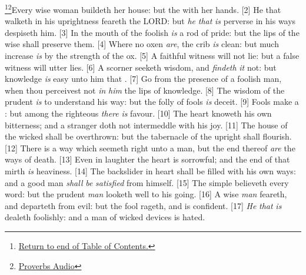 \footnote{\textcolor[cmyk]{0.99998,1,0,0}{\hyperlink{TOC}{Return to end of Table of Contents.}}}\footnote{\href{https://www.audioverse.org/english/audiobibles/books/ENGKJV/O/Prov/1}{\textcolor[cmyk]{0.99998,1,0,0}{Proverbs Audio}}}\textcolor[cmyk]{0.99998,1,0,0}{Every wise woman buildeth her house: but the  with her hands.}
[2] \textcolor[cmyk]{0.99998,1,0,0}{He that walketh in his uprightness feareth the LORD: but \emph{he} \emph{that} \emph{is} perverse in his ways despiseth him.}
[3] \textcolor[cmyk]{0.99998,1,0,0}{In the mouth of the foolish \emph{is} a rod of pride: but the lips of the wise shall preserve them.}
[4] \textcolor[cmyk]{0.99998,1,0,0}{Where no oxen \emph{are}, the crib \emph{is} clean: but much increase \emph{is} by the strength of the ox.}
[5] \textcolor[cmyk]{0.99998,1,0,0}{A faithful witness will not lie: but a false witness will utter lies.}
[6] \textcolor[cmyk]{0.99998,1,0,0}{A scorner seeketh wisdom, and \emph{findeth} \emph{it} not: but knowledge \emph{is} easy unto him that .}
[7] \textcolor[cmyk]{0.99998,1,0,0}{Go from the presence of a foolish man, when thou perceivest not \emph{in} \emph{him} the lips of knowledge.}
[8] \textcolor[cmyk]{0.99998,1,0,0}{The wisdom of the prudent \emph{is} to understand his way: but the folly of fools \emph{is} deceit.}
[9] \textcolor[cmyk]{0.99998,1,0,0}{Fools make a : but among the righteous \emph{there} \emph{is} favour.}
[10] \textcolor[cmyk]{0.99998,1,0,0}{The heart knoweth his own bitterness; and a stranger doth not intermeddle with his joy.}
[11] \textcolor[cmyk]{0.99998,1,0,0}{The house of the wicked shall be overthrown: but the tabernacle of the upright shall flourish.}
[12] \textcolor[cmyk]{0.99998,1,0,0}{There is a way which seemeth right unto a man, but the end thereof \emph{are} the ways of death.}
[13] \textcolor[cmyk]{0.99998,1,0,0}{Even in laughter the heart is sorrowful; and the end of that mirth \emph{is} heaviness.}
[14] \textcolor[cmyk]{0.99998,1,0,0}{The backslider in heart shall be filled with his own ways: and a good man \emph{shall} \emph{be} \emph{satisfied} from himself.}
[15] \textcolor[cmyk]{0.99998,1,0,0}{The simple believeth every word: but the prudent \emph{man} looketh well to his going.}
[16] \textcolor[cmyk]{0.99998,1,0,0}{A wise \emph{man} feareth, and departeth from evil: but the fool rageth, and is confident.}
[17] \textcolor[cmyk]{0.99998,1,0,0}{\emph{He} \emph{that} \emph{is}  dealeth foolishly: and a man of wicked devices is hated.}
